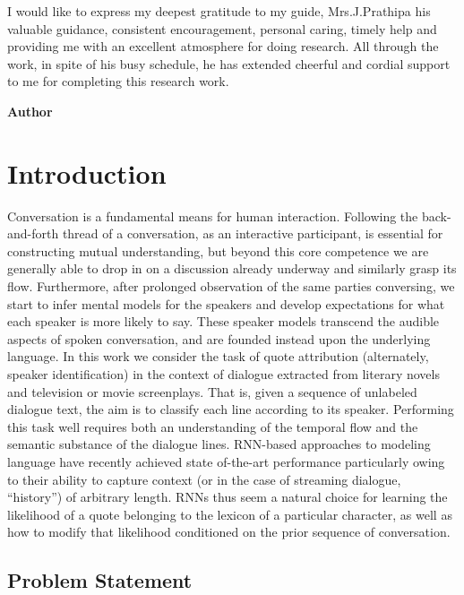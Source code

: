 \documentclass[BTech]{srmuthesis}
\begin{document}
\pagebreak
\acknowledgements
I would like to express my deepest gratitude to my guide, Mrs.J.Prathipa
his valuable guidance, consistent encouragement, personal caring, timely help and providing me with an excellent atmosphere for doing research. All through the work, in spite of his busy schedule, he has extended cheerful and cordial support to me for completing this research work.\\



\begin{flushright}
{\bf Author}
\end{flushright}


\chapter{Introduction}

Conversation is a fundamental means for human interaction. Following the back-and-forth thread of a conversation, as an interactive participant, is essential for constructing mutual understanding, but beyond this core competence we are generally able to drop in on a discussion already underway and similarly grasp its flow. Furthermore, after prolonged observation of the same parties conversing, we start to infer mental models for the speakers and develop expectations for what each speaker is more likely to say. These speaker models transcend the audible aspects of spoken conversation, and are founded instead upon the underlying language. In this work we consider the task of quote attribution (alternately, speaker identification) in the context of dialogue extracted from literary novels and television or movie screenplays. That is, given a sequence of unlabeled dialogue text, the aim is to classify each line according to its speaker. Performing this task well requires both an understanding of the temporal flow and the semantic substance of the dialogue lines. RNN-based approaches to modeling language have recently achieved state of-the-art performance  particularly owing to their ability to capture context (or in the case of streaming dialogue, “history”) of arbitrary length. RNNs thus seem a natural choice for learning the likelihood of a quote belonging to the lexicon of a particular character, as well as how to modify that likelihood conditioned on the prior sequence of conversation. 

\section{Problem Statement}
\end{document}
